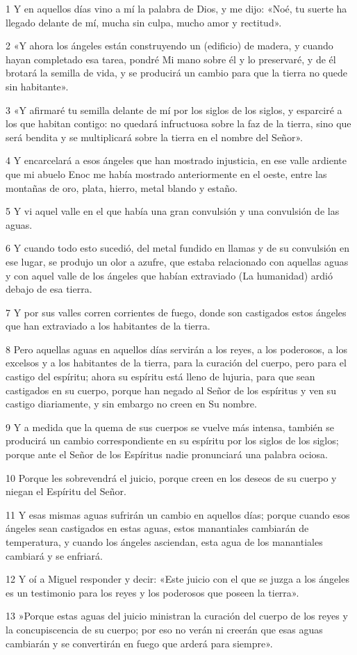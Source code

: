 \par 1 Y en aquellos días vino a mí la palabra de Dios, y me dijo: «Noé, tu suerte ha llegado delante de mí, mucha sin culpa, mucho amor y rectitud».
\par 2 «Y ahora los ángeles están construyendo un (edificio) de madera, y cuando hayan completado esa tarea, pondré Mi mano sobre él y lo preservaré, y de él brotará la semilla de vida, y se producirá un cambio para que la tierra no quede sin habitante».
\par 3 «Y afirmaré tu semilla delante de mí por los siglos de los siglos, y esparciré a los que habitan contigo: no quedará infructuosa sobre la faz de la tierra, sino que será bendita y se multiplicará sobre la tierra en el nombre del Señor».
\par 4 Y encarcelará a esos ángeles que han mostrado injusticia, en ese valle ardiente que mi abuelo Enoc me había mostrado anteriormente en el oeste, entre las montañas de oro, plata, hierro, metal blando y estaño.
\par 5 Y vi aquel valle en el que había una gran convulsión y una convulsión de las aguas.
\par 6 Y cuando todo esto sucedió, del metal fundido en llamas y de su convulsión en ese lugar, se produjo un olor a azufre, que estaba relacionado con aquellas aguas y con aquel valle de los ángeles que habían extraviado (La humanidad) ardió debajo de esa tierra.
\par 7 Y por sus valles corren corrientes de fuego, donde son castigados estos ángeles que han extraviado a los habitantes de la tierra.
\par 8 Pero aquellas aguas en aquellos días servirán a los reyes, a los poderosos, a los excelsos y a los habitantes de la tierra, para la curación del cuerpo, pero para el castigo del espíritu; ahora su espíritu está lleno de lujuria, para que sean castigados en su cuerpo, porque han negado al Señor de los espíritus y ven su castigo diariamente, y sin embargo no creen en Su nombre.
\par 9 Y a medida que la quema de sus cuerpos se vuelve más intensa, también se producirá un cambio correspondiente en su espíritu por los siglos de los siglos; porque ante el Señor de los Espíritus nadie pronunciará una palabra ociosa.
\par 10 Porque les sobrevendrá el juicio, porque creen en los deseos de su cuerpo y niegan el Espíritu del Señor.
\par 11 Y esas mismas aguas sufrirán un cambio en aquellos días; porque cuando esos ángeles sean castigados en estas aguas, estos manantiales cambiarán de temperatura, y cuando los ángeles asciendan, esta agua de los manantiales cambiará y se enfriará.
\par 12 Y oí a Miguel responder y decir: «Este juicio con el que se juzga a los ángeles es un testimonio para los reyes y los poderosos que poseen la tierra».
\par 13 »Porque estas aguas del juicio ministran la curación del cuerpo de los reyes y la concupiscencia de su cuerpo; por eso no verán ni creerán que esas aguas cambiarán y se convertirán en fuego que arderá para siempre».

